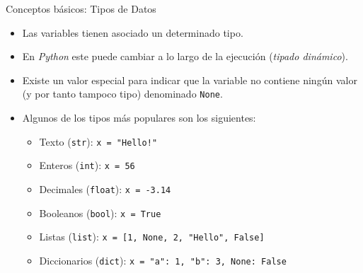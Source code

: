 \documentclass{beamer}
\begin{document}
    \begin{frame}{Conceptos básicos: Tipos de Datos}
        \begin{itemize}
            \item Las variables tienen asociado un determinado tipo.
            \item En \emph{Python} este puede cambiar a lo largo de la ejecución (\emph{tipado dinámico}).
            \item Existe un valor especial para indicar que la variable no contiene ningún valor (y por tanto tampoco tipo) denominado \texttt{None}.
            \item Algunos de los tipos más populares son los siguientes:
            \begin{itemize}
                \item Texto (\texttt{str}): \texttt{x = "Hello!"}
                \item Enteros (\texttt{int}): \texttt{x = 56}
                \item Decimales (\texttt{float}): \texttt{x = -3.14}
                \item Booleanos (\texttt{bool}): \texttt{x = True}
                \item Listas (\texttt{list}): \texttt{x = [1, None, 2, "Hello", False]}
                \item Diccionarios (\texttt{dict}): \texttt{x = {"a": 1, "b": 3, None: False}}
            \end{itemize}
        \end{itemize}
    \end{frame}
\end{document}

